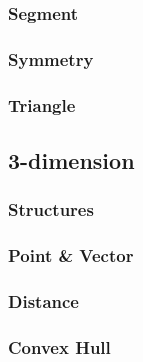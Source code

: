 \subsubsection{Segment}


\subsubsection{Symmetry}


\subsubsection{Triangle}



\subsection{3-dimension}
\subsubsection{Structures}


\subsubsection{Point \& Vector}


\subsubsection{Distance}


\subsubsection{Convex Hull}


